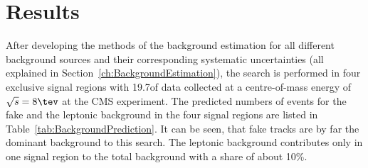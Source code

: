 \FloatBarrier
\chapter{Results}
\label{sec:Results}

After developing the methods of the background estimation for all different background sources and their corresponding systematic uncertainties (all explained in Section~\ref{ch:BackgroundEstimation}), 
the search is performed in four exclusive signal regions with 19.7\fbinv of data collected at a centre-of-mass energy of $\sqrt{s} = 8\tev$ at the CMS experiment.
The predicted numbers of events for the fake and the leptonic background in the four signal regions are listed in Table~\ref{tab:BackgroundPrediction}.
It can be seen, that fake tracks are by far the dominant background to this search.
The leptonic background contributes only in one signal region to the total background with a share of about 10\%.


